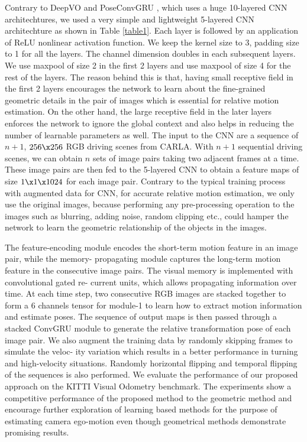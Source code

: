 \documentclass[letterpaper, 12pt]{article}
\theoremstyle{definition}
\theoremstyle{definition}
\theoremstyle{definition}
\theoremstyle{definition}
\theoremstyle{definition}
\begin{document}
Contrary to DeepVO \cite{Wang2017} and PoseConvGRU \cite{Zhai2019}, which uses a
huge 10-layered CNN architechtures, we used a very simple and lightweight
5-layered CNN architechture as shown in Table \ref{table1}. Each layer is
followed by an application of ReLU nonlinear activation function. We keep the
kernel size to 3, padding size to 1 for all the layers. The channel dimension
doubles in each subsequent layers. We use maxpool of size 2 in the first 2
layers and use maxpool of size 4 for the rest of the layers. The reason behind
this is that, having small receptive field in the first 2 layers encourages the
network to learn about the fine-grained geometric details in the pair of images
which is essential for relative motion estimation. On the other hand, the large
receptive field in the later layers enforces the network to ignore the global
context and also helps in reducing the number of learnable parameters as
well. The input to the CNN are a sequence of \(n+1\), \(256 \x 256\) RGB driving
scenes from CARLA. With \(n+1\) sequential driving scenes, we can obtain \(n\)
sets of image pairs taking two adjacent frames at a time. These image pairs are
then fed to the 5-layered CNN to obtain a feature maps of size \(1 \x 1 \x
1024\) for each image pair. Contrary to the typical training process with
augmented data for CNN, for accurate relative motion estimation, we only use the
original images, because performing any pre-processing operation to the images
such as blurring, adding noise, random clipping etc., could hamper the network
to learn the geometric relationship of the objects in the images.


The feature-encoding module
encodes the short-term motion feature in an image pair, while the memory-
propagating module captures the long-term motion feature in the consecutive
image pairs. The visual memory is implemented with convolutional gated re-
current units, which allows propagating information over time. At each time
step, two consecutive RGB images are stacked together to form a 6 channels
tensor for module-1 to learn how to extract motion information and estimate
poses. The sequence of output maps is then passed through a stacked ConvGRU module to generate the relative transformation pose of each image pair. We also
augment the training data by randomly skipping frames to simulate the veloc-
ity variation which results in a better performance in turning and high-velocity
situations. Randomly horizontal flipping and temporal flipping of the sequences
is also performed. We evaluate the performance of our proposed approach on
the KITTI Visual Odometry benchmark. The experiments show a competitive
performance of the proposed method to the geometric method and encourage
further exploration of learning based methods for the purpose of estimating
camera ego-motion even though geometrical methods demonstrate promising
results.
\end{document}
